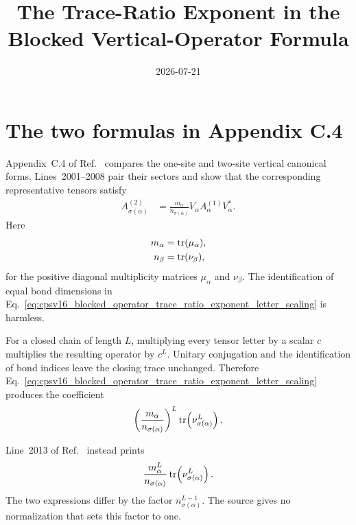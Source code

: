 \documentclass{article}
\title{The Trace-Ratio Exponent in the Blocked Vertical-Operator Formula}
\author{}
\date{2026-07-21}
\begin{document}
\maketitle
{}

\section{The two formulas in Appendix C.4}

Appendix~C.4 of Ref.~\cite{Cirac2016MPDO_arXiv} compares the one-site and
two-site vertical canonical forms. Lines~2001--2008 pair their sectors and
show that the corresponding representative tensors satisfy
\begin{align}
    A^{(2)}_{\sigma(\alpha)}
        &=
    \frac{m_\alpha}{n_{\sigma(\alpha)}}
    V_\alpha A^{(1)}_\alpha V_\alpha^*.
    \label{eq:cpsv16_blocked_operator_trace_ratio_exponent_letter_scaling}
\end{align}
Here
\begin{align}
    m_\alpha
        &=
    \operatorname{tr}(\mu_\alpha),
    \label{eq:cpsv16_blocked_operator_trace_ratio_exponent_first_multiplicity_trace}\\
    n_\beta
        &=
    \operatorname{tr}(\nu_\beta),
    \label{eq:cpsv16_blocked_operator_trace_ratio_exponent_second_multiplicity_trace}
\end{align}
for the positive diagonal multiplicity matrices $\mu_\alpha$ and $\nu_\beta$.
The identification of equal bond dimensions in
Eq.~\ref{eq:cpsv16_blocked_operator_trace_ratio_exponent_letter_scaling} is
harmless.

For a closed chain of length $L$, multiplying every tensor letter by a scalar
$c$ multiplies the resulting operator by $c^L$. Unitary conjugation and the
identification of bond indices leave the closing trace unchanged. Therefore
Eq.~\ref{eq:cpsv16_blocked_operator_trace_ratio_exponent_letter_scaling}
produces the coefficient
\begin{align}
    \left(\frac{m_\alpha}{n_{\sigma(\alpha)}}\right)^L
    \operatorname{tr}\!\left(\nu_{\sigma(\alpha)}^L\right).
    \label{eq:cpsv16_blocked_operator_trace_ratio_exponent_correct_coefficient}
\end{align}

Line~2013 of Ref.~\cite{Cirac2016MPDO_arXiv} instead prints
\begin{align}
    \frac{m_\alpha^L}{n_{\sigma(\alpha)}}
    \operatorname{tr}\!\left(\nu_{\sigma(\alpha)}^L\right).
    \label{eq:cpsv16_blocked_operator_trace_ratio_exponent_printed_coefficient}
\end{align}
The two expressions differ by the factor
$n_{\sigma(\alpha)}^{L-1}$. The source gives no normalization that sets this
factor to one.
\end{document}
